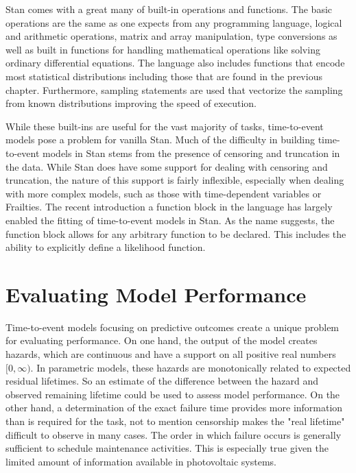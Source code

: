 Stan comes with a great many of built-in operations and functions. The basic operations are the same as one expects from any programming language, logical and arithmetic operations, matrix and array manipulation, type conversions as well as built in functions for handling mathematical operations like solving ordinary differential equations. The language also includes functions that encode most statistical distributions including those that are found in the previous chapter. Furthermore, sampling statements are used that vectorize the sampling from known distributions improving the speed of execution. 

While these built-ins are useful for the vast majority of tasks, time-to-event models pose a problem for vanilla Stan. Much of the difficulty in building time-to-event models in Stan stems from the presence of censoring and truncation in the data. While Stan does have some support for dealing with censoring and truncation, the nature of this support is fairly inflexible, especially when dealing with more complex models, such as those with time-dependent variables or Frailties. The recent introduction a function block in the language has largely enabled the fitting of time-to-event models in Stan. As the name suggests, the function block allows for any arbitrary function to be declared. This includes the ability to explicitly define a likelihood function.




\section*{Evaluating Model Performance}

Time-to-event models focusing on predictive outcomes create a unique problem for evaluating performance. On one hand, the output of the model creates hazards, which are continuous and have a support on all positive real numbers $[0, \infty)$. In parametric models, these hazards are monotonically related to expected residual lifetimes. So an estimate of the difference between the hazard and observed remaining lifetime could be used to assess model performance. On the other hand, a determination of the exact failure time provides more information than is required for the task, not to mention censorship makes the "real lifetime" difficult to observe in many cases. The order in which failure occurs is generally sufficient to schedule maintenance activities. This is especially true given the limited amount of information available in photovoltaic systems. 

